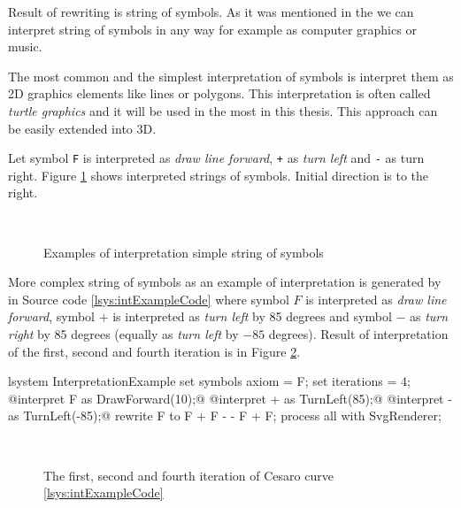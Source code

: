 Result of \lsystem rewriting is string of symbols.
As it was mentioned in the  we can interpret string of symbols in any way for example as computer graphics or music.

The most common and the simplest interpretation of \lsystem symbols is interpret them as 2D graphics elements like lines or polygons.
This interpretation is often called \emph{turtle graphics} and it will be used in the most \lsystems in this thesis.
This approach can be easily extended into 3D.

Let symbol \texttt{F} is interpreted as \emph{draw line forward}, \texttt{+} as \emph{turn left} and \texttt{-} as turn right.
Figure \ref{fig:intSequences} shows interpreted strings of symbols.
Initial direction is to the right.

\begin{figure}[h]
	\centering
	 ~
	 ~
	\caption{Examples of interpretation simple string of symbols}
	\label{fig:intSequences}
\end{figure}


More complex string of symbols as an example of interpretation is generated by \lsystem in Source code \ref{lsys:intExampleCode} where symbol $F$ is interpreted as \emph{draw line forward}, symbol $+$ is interpreted as \emph{turn left} by 85 degrees and symbol $-$ as \emph{turn right} by 85 degrees (equally as \emph{turn left} by $-85$ degrees).
Result of interpretation of the first, second and fourth iteration is in Figure \ref{fig:intExample}.

\begin{Lsystem}[label=lsys:intExampleCode,caption={Symbol interpretation example}]
lsystem InterpretationExample {
	set symbols axiom = F;
	set iterations = 4;
	@interpret F as DrawForward(10);@
	@interpret + as TurnLeft(85);@
	@interpret - as TurnLeft(-85);@
	rewrite F to F + F - - F + F;
}
process all with SvgRenderer;
\end{Lsystem}

\begin{figure}[h]
	\centering
	 ~
	 ~
	\caption{The first, second and fourth iteration of Cesaro curve \lsystem \ref{lsys:intExampleCode}}
	\label{fig:intExample}
\end{figure}

